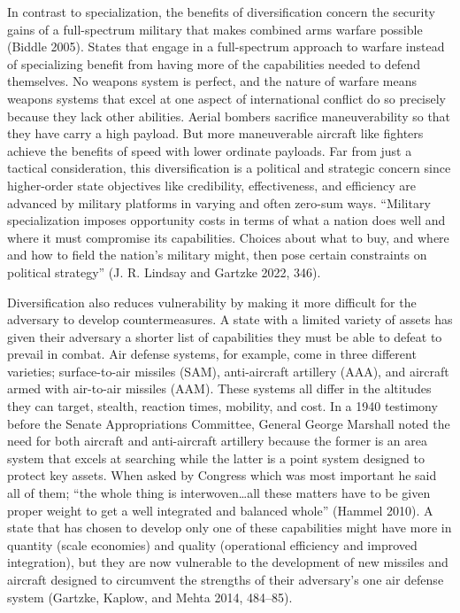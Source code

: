 \documentclass[
  12,
  letterpaper,
  DIV=11,
  numbers=noendperiod]{scrartcl}
\begin{document}
In contrast to specialization, the benefits of diversification concern
the security gains of a full-spectrum military that makes combined arms
warfare possible (Biddle 2005). States that engage in a full-spectrum
approach to warfare instead of specializing benefit from having more of
the capabilities needed to defend themselves. No weapons system is
perfect, and the nature of warfare means weapons systems that excel at
one aspect of international conflict do so precisely because they lack
other abilities. Aerial bombers sacrifice maneuverability so that they
have carry a high payload. But more maneuverable aircraft like fighters
achieve the benefits of speed with lower ordinate payloads. Far from
just a tactical consideration, this diversification is a political and
strategic concern since higher-order state objectives like credibility,
effectiveness, and efficiency are advanced by military platforms in
varying and often zero-sum ways. ``Military specialization imposes
opportunity costs in terms of what a nation does well and where it must
compromise its capabilities. Choices about what to buy, and where and
how to field the nation's military might, then pose certain constraints
on political strategy'' (J. R. Lindsay and Gartzke 2022, 346).

Diversification also reduces vulnerability by making it more difficult
for the adversary to develop countermeasures. A state with a limited
variety of assets has given their adversary a shorter list of
capabilities they must be able to defeat to prevail in combat. Air
defense systems, for example, come in three different varieties;
surface-to-air missiles (SAM), anti-aircraft artillery (AAA), and
aircraft armed with air-to-air missiles (AAM). These systems all differ
in the altitudes they can target, stealth, reaction times, mobility, and
cost. In a 1940 testimony before the Senate Appropriations Committee,
General George Marshall noted the need for both aircraft and
anti-aircraft artillery because the former is an area system that excels
at searching while the latter is a point system designed to protect key
assets. When asked by Congress which was most important he said all of
them; ``the whole thing is interwoven\ldots all these matters have to be
given proper weight to get a well integrated and balanced whole''
(Hammel 2010). A state that has chosen to develop only one of these
capabilities might have more in quantity (scale economies) and quality
(operational efficiency and improved integration), but they are now
vulnerable to the development of new missiles and aircraft designed to
circumvent the strengths of their adversary's one air defense system
(Gartzke, Kaplow, and Mehta 2014, 484--85).
\end{document}
